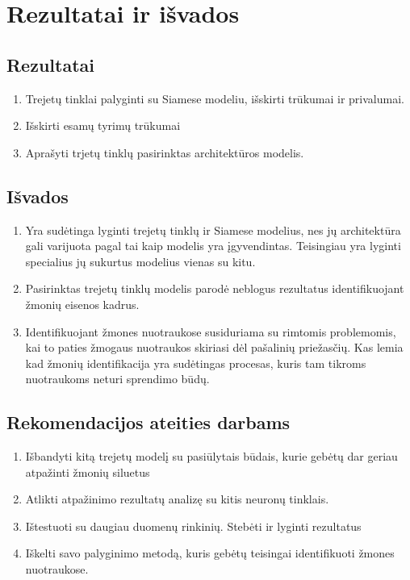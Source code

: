 \documentclass{VUMIFPSkursinis}
\begin{document}
\section{Rezultatai ir išvados}
\thispagestyle{empty} 
\subsection{Rezultatai}
\begin{enumerate}
\item{Trejetų tinklai palyginti su Siamese modeliu, išskirti trūkumai ir privalumai.}
\item{Išskirti esamų tyrimų trūkumai}
\item{Aprašyti trjetų tinklų pasirinktas architektūros modelis.}
\end{enumerate}
\subsection{Išvados}
\begin{enumerate}
\item{Yra sudėtinga lyginti trejetų tinklų ir Siamese modelius, nes jų architektūra gali varijuota pagal tai kaip modelis yra įgyvendintas. Teisingiau yra lyginti specialius jų sukurtus modelius vienas su kitu.}
\item{Pasirinktas trejetų tinklų modelis parodė neblogus rezultatus identifikuojant žmonių eisenos kadrus.}
\item{Identifikuojant žmones nuotraukose susiduriama su rimtomis problemomis, kai to paties žmogaus nuotraukos skiriasi dėl pašalinių priežasčių. Kas lemia kad žmonių identifikacija yra sudėtingas procesas, kuris tam tikroms nuotraukoms neturi sprendimo būdų.}
\end{enumerate}
\subsection{Rekomendacijos ateities darbams}
\begin{enumerate}
\item{Išbandyti kitą trejetų modelį su pasiūlytais būdais, kurie gebėtų dar geriau atpažinti žmonių siluetus}
\item{Atlikti atpažinimo rezultatų analizę su kitis neuronų tinklais.}
\item{Ištestuoti su daugiau duomenų rinkinių. Stebėti ir lyginti rezultatus}
\item{Iškelti savo palyginimo metodą, kuris gebėtų teisingai identifikuoti žmones nuotraukose.}
\end{enumerate}
\pagebreak
\end{document}
